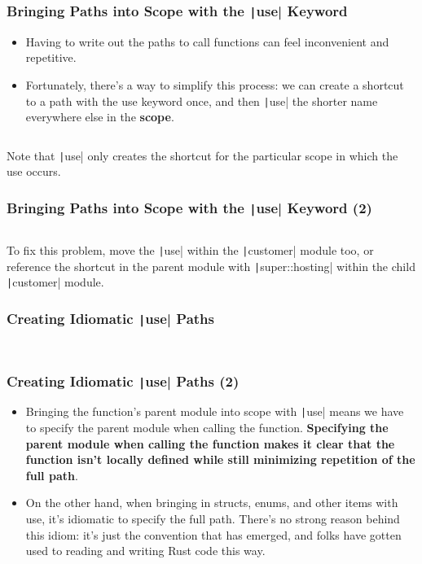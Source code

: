 \documentclass{beamer}
\begin{document}
\begin{frame}[fragile]
	\frametitle{Bringing Paths into Scope with the \texttt|use|  Keyword}
	\begin{itemize}
		\item Having to write out the paths to call functions can feel inconvenient and repetitive. 
		\item 	Fortunately, there’s a way to simplify this process: we can create a shortcut to a path with the use keyword once, and then \texttt|use| the shorter name everywhere else in the \textbf{scope}.
	\end{itemize}
	\inputminted{rust}{./code/module5.rs}
	
	Note that  \texttt|use| only creates the shortcut for the particular scope in which the use occurs.
\end{frame}


\begin{frame}[fragile]
	\frametitle{Bringing Paths into Scope with the \texttt|use|  Keyword (2)}
	\inputminted{rust}{./code/module6.rs}
	To fix this problem, move the \texttt|use| within the \texttt|customer| module too, or reference the shortcut in the parent module with \texttt|super::hosting|  within the child \texttt|customer| module.
\end{frame}



\begin{frame}[fragile]
	\frametitle{Creating Idiomatic \texttt|use| Paths}
	\inputminted[fontsize=\scriptsize]{rust}{./code/module8.rs}
	
	\inputminted[fontsize=\scriptsize]{rust}{./code/module7.rs}
\end{frame}


\begin{frame}[fragile]
	\frametitle{Creating Idiomatic \texttt|use| Paths (2)}
	\begin{itemize}
		\item Bringing the function’s parent module into scope with \texttt|use| means we have to specify the parent module when calling the function. \textbf{Specifying the parent module when calling the function makes it clear that the function isn’t locally defined while still minimizing repetition of the full path}. 
		\item On the other hand, when bringing in structs, enums, and other items with use, it’s idiomatic to specify the full path. There’s no strong reason behind this idiom: it’s just the convention that has emerged, and folks have gotten used to reading and writing Rust code this way.
		\inputminted[fontsize=\scriptsize]{rust}{./code/module9.rs}
	\end{itemize}
\end{frame}
\end{document}
